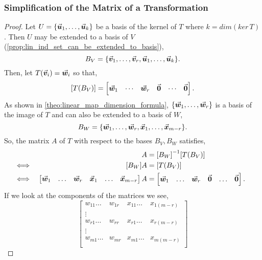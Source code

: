 \documentclass[MathsNotesBase.tex]{subfiles}
\begin{document}
{		\subsubsection{Simplification of the Matrix of a Transformation}
		\medskip
		\begin{proof}
			Let ${ U = \{\vec{\bm{u}}_1,\dots,\vec{\bm{u}}_k\} }$ be a basis of the kernel of $T$ where ${ k = dim(ker\,T) }$. Then $U$ may be extended to a basis of $V$ (\autoref{prop:lin_ind_set_can_be_extended_to_basis}),
			\[ B_V = \{\vec{\bm{v}}_1,\dots,\vec{\bm{v}}_r,\vec{\bm{u}}_1,\dots,\vec{\bm{u}}_k\}. \]
			Then, let ${ T(\vec{\bm{v}}_i) = \vec{\bm{w}}_i }$ so that,
			\[ [T(B_V)] = \begin{bmatrix}
						\vec{\bm{w}}_1 & \cdots & \vec{\bm{w}}_r & \vec{\bm{0}} & \cdots & \vec{\bm{0}}
						\end{bmatrix}. 
			\]
			As shown in \autoref{theo:linear_map_dimension_formula}, ${ \{ \vec{\bm{w}}_1,\dots,\vec{\bm{w}}_r \} }$ is a basis of the image of $T$ and can also be extended to a basis of $W$,
			\[ B_W = \{ \vec{\bm{w}}_1,\dots,\vec{\bm{w}}_r, \vec{\bm{x}}_1,\dots, \vec{\bm{x}}_{m-r} \}. \]
			So, the matrix $A$ of $T$ with respect to the bases ${ B_V,B_W }$ satisfies,
			\begin{align*}
			&& A &= {[B_W]}^{-1}[T(B_V)] \\
			&\iff & [B_W]A &= [T(B_V)] \\
			&\iff & \begin{bmatrix}\vec{\bm{w}}_1 & \dots & \vec{\bm{w}}_r & \vec{\bm{x}}_1 & \dots & \vec{\bm{x}}_{m-r}\end{bmatrix}A &= 
					\begin{bmatrix}\vec{\bm{w}}_1 & \dots & \vec{\bm{w}}_r & \vec{\bm{0}} & \dots & \vec{\bm{0}}\end{bmatrix}. &\text{\scriptsize{}}
			\end{align*}
			If we look at the components of the matrices we see,
			\[  
				\begin{bmatrix}
				w_{11} \dots & w_{1r} & x_{11} \dots & x_{1(m-r)} \\
				\vdots &  &  &  \\
				w_{r1} \dots & w_{rr} & x_{r1} \dots & x_{r(m-r)} \\
				\vdots &  &  &  \\
				w_{m1} \dots & w_{mr} & x_{m1} \dots & x_{m(m-r)} \\

\end{bmatrix}\]
\end{proof}}
\end{document}
